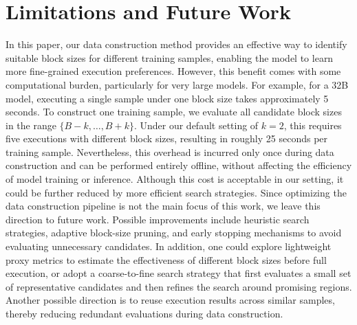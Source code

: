 \documentclass{llmxive}
\begin{document}
\section{Limitations and Future Work}
\label{Limitations}
In this paper, our data construction method provides an effective way to identify suitable block sizes for different training samples, enabling the model to learn more fine-grained execution preferences. However, this benefit comes with some computational burden, particularly for very large models. For example, for a 32B model, executing a single sample under one block size takes approximately 5 seconds. To construct one training sample, we evaluate all candidate block sizes in the range $\{B-k,\dots,B+k\}$. Under our default setting of $k=2$, this requires five executions with different block sizes, resulting in roughly 25 seconds per training sample. Nevertheless, this overhead is incurred only once during data construction and can be performed entirely offline, without affecting the efficiency of model training or inference. Although this cost is acceptable in our setting, it could be further reduced by more efficient search strategies. Since optimizing the data construction pipeline is not the main focus of this work, we leave this direction to future work. Possible improvements include heuristic search strategies, adaptive block-size pruning, and early stopping mechanisms to avoid evaluating unnecessary candidates. In addition, one could explore lightweight proxy metrics to estimate the effectiveness of different block sizes before full execution, or adopt a coarse-to-fine search strategy that first evaluates a small set of representative candidates and then refines the search around promising regions. Another possible direction is to reuse execution results across similar samples, thereby reducing redundant evaluations during data construction.





\end{document}

